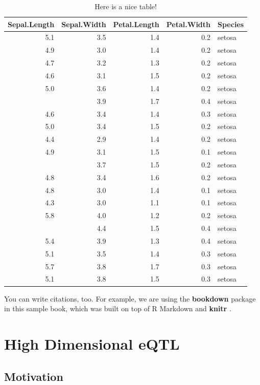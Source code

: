 \documentclass[11pt,]{book}
\theoremstyle{definition}
\theoremstyle{definition}
\theoremstyle{remark}
\begin{document}
\begin{table}

\caption{\label{tab:nice-tab}Here is a nice table!}
\centering
\begin{tabular}[t]{rrrrl}
\toprule
Sepal.Length & Sepal.Width & Petal.Length & Petal.Width & Species\\
\midrule
5.1 & 3.5 & 1.4 & 0.2 & setosa\\
4.9 & 3.0 & 1.4 & 0.2 & setosa\\
4.7 & 3.2 & 1.3 & 0.2 & setosa\\
4.6 & 3.1 & 1.5 & 0.2 & setosa\\
5.0 & 3.6 & 1.4 & 0.2 & setosa\\
\addlinespace
5.4 & 3.9 & 1.7 & 0.4 & setosa\\
4.6 & 3.4 & 1.4 & 0.3 & setosa\\
5.0 & 3.4 & 1.5 & 0.2 & setosa\\
4.4 & 2.9 & 1.4 & 0.2 & setosa\\
4.9 & 3.1 & 1.5 & 0.1 & setosa\\
\addlinespace
5.4 & 3.7 & 1.5 & 0.2 & setosa\\
4.8 & 3.4 & 1.6 & 0.2 & setosa\\
4.8 & 3.0 & 1.4 & 0.1 & setosa\\
4.3 & 3.0 & 1.1 & 0.1 & setosa\\
5.8 & 4.0 & 1.2 & 0.2 & setosa\\
\addlinespace
5.7 & 4.4 & 1.5 & 0.4 & setosa\\
5.4 & 3.9 & 1.3 & 0.4 & setosa\\
5.1 & 3.5 & 1.4 & 0.3 & setosa\\
5.7 & 3.8 & 1.7 & 0.3 & setosa\\
5.1 & 3.8 & 1.5 & 0.3 & setosa\\
\bottomrule
\end{tabular}
\end{table}

You can write citations, too. For example, we are using the
\textbf{bookdown} package \citep{R-bookdown} in this sample book, which
was built on top of R Markdown and \textbf{knitr} \citep{xie2015}.

\chapter{High Dimensional eQTL}\label{highdeqtl}

\section{Motivation}\label{motivation}
\end{document}
